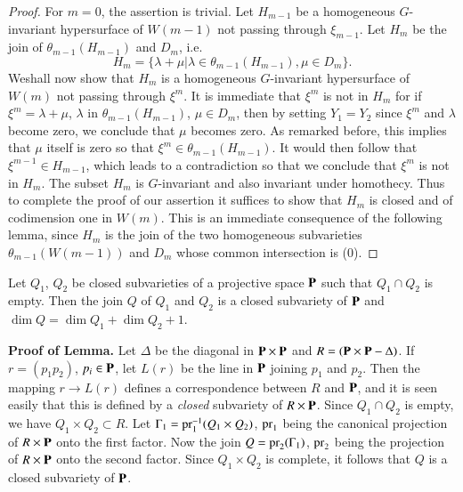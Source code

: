 \begin{proof}
For $m=0$, the assertion is trivial. Let $H_{m-1}$ be a homogeneous $G$-invariant hypersurface of $W(m-1)$ not passing through $\xi_{m-1}$. Let $H_{m}$ be the join of $\theta_{m-1}(H_{m-1})$ and $D_{m}$, i.e.
$$
H_{m}=\{\lambda+\mu|\lambda\in \theta_{m-1}(H_{m-1}), \mu\in D_{m}\}.
$$
We\pageoriginale shall now show that $H_{m}$ is a homogeneous $G$-invariant hypersurface of $W(m)$ not passing through $\xi^{m}$. It is immediate that $\xi^{m}$ is not in $H_{m}$ for if $\xi^{m}=\lambda+\mu$, $\lambda$ in $\theta_{m-1}(H_{m-1})$, $\mu\in D_{m}$, then by setting $Y_{1}=Y_{2}$ since $\xi^{m}$ and $\lambda$ become zero, we conclude that $\mu$ becomes zero. As remarked before, this implies that $\mu$ itself is zero so that $\xi^{m}\in \theta_{m-1}(H_{m-1})$. It would then follow that $\xi^{m-1}\in H_{m-1}$, which leads to a contradiction so that we conclude that $\xi^{m}$ is not in $H_{m}$. The subset $H_{m}$ is $G$-invariant and also invariant under homothecy. Thus to complete the proof of our assertion it suffices to show that $H_{m}$ is closed and of codimension one in $W(m)$. This is an immediate consequence of the following lemma, since $H_{m}$ is the join of the two homogeneous subvarieties $\theta_{m-1}(W(m-1))$ and $D_{m}$ whose common intersection is (0).
\end{proof}

\begin{lemma}\label{art18-lem1}
Let $Q_{1}$, $Q_{2}$ be closed subvarieties of a projective space $\mathbf{P}$ such that $Q_{1}\cap Q_{2}$ is empty. Then the join $Q$ of $Q_{1}$ and $Q_{2}$ is a closed subvariety of $\mathbf{P}$ and $\dim Q=\dim Q_{1}+\dim Q_{2}+1$.
\end{lemma}

\noindent
{\bf Proof of Lemma.} Let $\Delta$ be the diagonal in $\mathbf{P}\times \mathbf{P}$ and $R=(\mathbf{P}\times \mathbf{P}-\Delta)$. If $r=(p_{1}p_{2})$, $p_{i}\in \mathbf{P}$, let $L(r)$ be the line in $\mathbf{P}$ joining $p_{1}$ and $p_{2}$. Then the mapping $r\to L(r)$ defines a correspondence between $R$ and $\mathbf{P}$, and it is seen easily that this is defined by a {\em closed} subvariety of $R\times \mathbf{P}$. Since $Q_{1}\cap Q_{2}$ is empty, we have $Q_{1}\times Q_{2}\subset R$. Let $\Gamma_{1}=\operatorname{\mathrm{pr}}^{-1}_{1}(Q_{1}\times Q_{2})$, $\operatorname{\mathrm{pr}}_{1}$ being the canonical projection of $R\times \mathbf{P}$ onto the first factor. Now the join $Q=\operatorname{\mathrm{pr}}_{2}(\Gamma_{1})$, $\operatorname{\mathrm{pr}}_{2}$ being the projection of $R\times \mathbf{P}$ onto the second factor. Since $Q_{1}\times Q_{2}$ is complete, it follows that $Q$ is a closed subvariety of $\mathbf{P}$.

